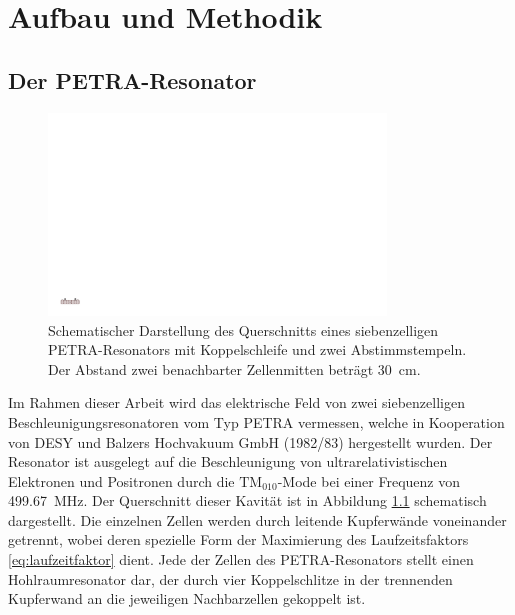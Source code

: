 \chapter{Aufbau und Methodik}
\label{sec:aufbau_und_methodik}


\section{Der PETRA-Resonator}
\begin{figure}[htb]
  \centering
  \includegraphics[width=0.8\textwidth]{./figs/cavity/cavity.pdf}
  \caption{Schematischer Darstellung des Querschnitts eines siebenzelligen PETRA-Resonators mit Koppelschleife und zwei Abstimmstempeln. Der Abstand zwei benachbarter Zellenmitten beträgt \SI{30}{\centi\metre}.}
  \label{fig:petra_cavity}
\end{figure}
Im Rahmen dieser Arbeit wird das elektrische Feld von zwei siebenzelligen Beschleunigungsresonatoren vom Typ PETRA \cite{desy_petra} vermessen, welche in Kooperation von DESY und Balzers Hochvakuum GmbH (1982/83) hergestellt wurden.
Der Resonator ist ausgelegt auf die Beschleunigung von ultrarelativistischen Elektronen und Positronen durch die $\mathrm{TM}_{010}$-Mode bei einer Frequenz von \SI{499.67}{MHz}.
Der Querschnitt dieser Kavität ist in Abbildung \ref{fig:petra_cavity} schematisch dargestellt.
Die einzelnen Zellen werden durch leitende Kupferwände voneinander getrennt, wobei deren spezielle Form der Maximierung des Laufzeitsfaktors \eqref{eq:laufzeitfaktor} dient.
Jede der Zellen des PETRA-Resonators stellt einen Hohlraumresonator dar, der durch vier Koppelschlitze in der trennenden Kupferwand an die jeweiligen Nachbarzellen gekoppelt ist.
